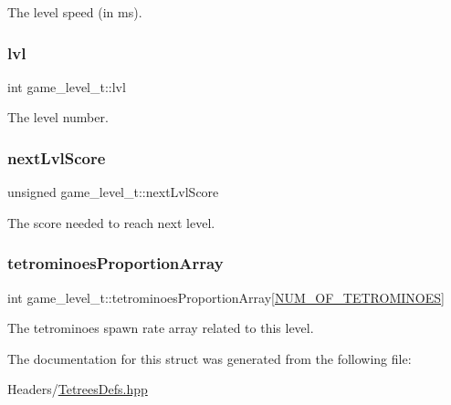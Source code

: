The level speed (in ms). \mbox{\label{structgame__level__t_ab80383a9c51e3ad25cda4df0a7df8df2}} 
\subsubsection{\texorpdfstring{lvl}{lvl}}
{\footnotesize\ttfamily int game\+\_\+level\+\_\+t\+::lvl}

The level number. \mbox{\label{structgame__level__t_a9f5f86c9c90bebdd20950d74bf2dd450}} 
\subsubsection{\texorpdfstring{next\+Lvl\+Score}{nextLvlScore}}
{\footnotesize\ttfamily unsigned game\+\_\+level\+\_\+t\+::next\+Lvl\+Score}

The score needed to reach next level. \mbox{\label{structgame__level__t_abcef20ad8f4df7d270a4d5111ac8d85a}} 
\subsubsection{\texorpdfstring{tetrominoes\+Proportion\+Array}{tetrominoesProportionArray}}
{\footnotesize\ttfamily int game\+\_\+level\+\_\+t\+::tetrominoes\+Proportion\+Array\mbox{[}\mbox{\hyperlink{TetreesDefs_8hpp_a69fa4aa1afe74f7f9ec42bf1e07ddf28}{N\+U\+M\+\_\+\+O\+F\+\_\+\+T\+E\+T\+R\+O\+M\+I\+N\+O\+ES}}\mbox{]}}

The tetrominoes spawn rate array related to this level. 

The documentation for this struct was generated from the following file\+:\begin{DoxyCompactItemize}
\item 
Headers/\mbox{\hyperlink{TetreesDefs_8hpp}{Tetrees\+Defs.\+hpp}}\end{DoxyCompactItemize}
